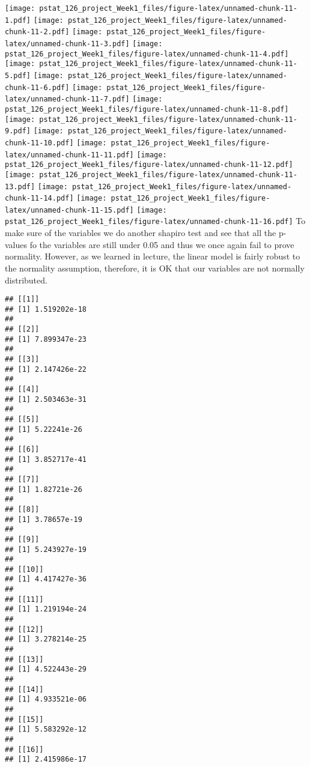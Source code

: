 \documentclass[
]{article}
\newenvironment{Shaded}{\begin{snugshade}}{\end{snugshade}}
\newcommand{\ControlFlowTok}[1]{\textcolor[rgb]{0.13,0.29,0.53}{\textbf{#1}}}
\newcommand{\DecValTok}[1]{\textcolor[rgb]{0.00,0.00,0.81}{#1}}
\newcommand{\FunctionTok}[1]{\textcolor[rgb]{0.00,0.00,0.00}{#1}}
\newcommand{\NormalTok}[1]{#1}
\newcommand{\OtherTok}[1]{\textcolor[rgb]{0.56,0.35,0.01}{#1}}
\newcommand{\SpecialCharTok}[1]{\textcolor[rgb]{0.00,0.00,0.00}{#1}}
\begin{document}
\texttt{[image: pstat\_126\_project\_Week1\_files/figure-latex/unnamed-chunk-11-1.pdf]}
\texttt{[image: pstat\_126\_project\_Week1\_files/figure-latex/unnamed-chunk-11-2.pdf]}
\texttt{[image: pstat\_126\_project\_Week1\_files/figure-latex/unnamed-chunk-11-3.pdf]}
\texttt{[image: pstat\_126\_project\_Week1\_files/figure-latex/unnamed-chunk-11-4.pdf]}
\texttt{[image: pstat\_126\_project\_Week1\_files/figure-latex/unnamed-chunk-11-5.pdf]}
\texttt{[image: pstat\_126\_project\_Week1\_files/figure-latex/unnamed-chunk-11-6.pdf]}
\texttt{[image: pstat\_126\_project\_Week1\_files/figure-latex/unnamed-chunk-11-7.pdf]}
\texttt{[image: pstat\_126\_project\_Week1\_files/figure-latex/unnamed-chunk-11-8.pdf]}
\texttt{[image: pstat\_126\_project\_Week1\_files/figure-latex/unnamed-chunk-11-9.pdf]}
\texttt{[image: pstat\_126\_project\_Week1\_files/figure-latex/unnamed-chunk-11-10.pdf]}
\texttt{[image: pstat\_126\_project\_Week1\_files/figure-latex/unnamed-chunk-11-11.pdf]}
\texttt{[image: pstat\_126\_project\_Week1\_files/figure-latex/unnamed-chunk-11-12.pdf]}
\texttt{[image: pstat\_126\_project\_Week1\_files/figure-latex/unnamed-chunk-11-13.pdf]}
\texttt{[image: pstat\_126\_project\_Week1\_files/figure-latex/unnamed-chunk-11-14.pdf]}
\texttt{[image: pstat\_126\_project\_Week1\_files/figure-latex/unnamed-chunk-11-15.pdf]}
\texttt{[image: pstat\_126\_project\_Week1\_files/figure-latex/unnamed-chunk-11-16.pdf]}
To make sure of the variables we do another shapiro test and see that
all the p-values fo the variables are still under 0.05 and thus we once
again fail to prove normality. However, as we learned in lecture, the
linear model is fairly robust to the normality assumption, therefore, it
is OK that our variables are not normally distributed.

\begin{Shaded}
\end{Shaded}

\begin{verbatim}
## [[1]]
## [1] 1.519202e-18
## 
## [[2]]
## [1] 7.899347e-23
## 
## [[3]]
## [1] 2.147426e-22
## 
## [[4]]
## [1] 2.503463e-31
## 
## [[5]]
## [1] 5.22241e-26
## 
## [[6]]
## [1] 3.852717e-41
## 
## [[7]]
## [1] 1.82721e-26
## 
## [[8]]
## [1] 3.78657e-19
## 
## [[9]]
## [1] 5.243927e-19
## 
## [[10]]
## [1] 4.417427e-36
## 
## [[11]]
## [1] 1.219194e-24
## 
## [[12]]
## [1] 3.278214e-25
## 
## [[13]]
## [1] 4.522443e-29
## 
## [[14]]
## [1] 4.933521e-06
## 
## [[15]]
## [1] 5.583292e-12
## 
## [[16]]
## [1] 2.415986e-17
\end{verbatim}
\end{document}
